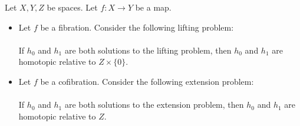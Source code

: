 \documentclass[a4paper]{article}
\begin{document}
\begin{prp}{}{} Let $X,Y,Z$ be spaces. Let $f:X\to Y$ be a map. 
\begin{itemize}
\item Let $f$ be a fibration. Consider the following lifting problem: \\
\\
If $h_0$ and $h_1$ are both solutions to the lifting problem, then $h_0$ and $h_1$ are homotopic relative to $Z\times\{0\}$. 
\item Let $f$ be a cofibration. Consider the following extension problem: \\
\\
If $h_0$ and $h_1$ are both solutions to the extension problem, then $h_0$ and $h_1$ are homotopic relative to $Z$. 
\end{itemize}
\end{prp}
\end{document}
